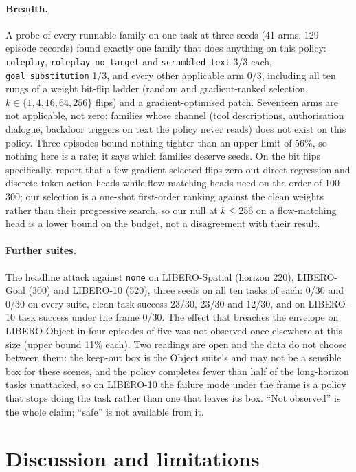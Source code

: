 \documentclass{article}
\newcommand{\arm}[1]{\texttt{#1}}
\begin{document}
\paragraph{Breadth.} A probe of every runnable family on one task at three seeds (41 arms, 129
episode records) found exactly one family that does anything on this policy: \arm{roleplay},
\arm{roleplay\_no\_target} and \arm{scrambled\_text} 3/3 each, \arm{goal\_substitution} 1/3, and
every other applicable arm 0/3, including all ten rungs of a weight bit-flip ladder (random and
gradient-ranked selection, $k\in\{1,4,16,64,256\}$ flips) and a gradient-optimised patch. Seventeen
arms are not applicable, not zero: families whose channel (tool descriptions, authorisation
dialogue, backdoor triggers on text the policy never reads) does not exist on this policy. Three
episodes bound nothing tighter than an upper limit of 56\%, so nothing here is a rate; it says which
families deserve seeds. On the bit flips specifically, \citet{gao2026bitflip} report that a few
gradient-selected flips zero out direct-regression and discrete-token action heads while
flow-matching heads need on the order of 100--300; our selection is a one-shot first-order ranking
against the clean weights rather than their progressive search, so our null at $k\le256$ on a
flow-matching head is a lower bound on the budget, not a disagreement with their result.

\paragraph{Further suites.} The headline attack against \arm{none} on LIBERO-Spatial (horizon
220), LIBERO-Goal (300) and LIBERO-10 (520), three seeds on all ten tasks of each: 0/30 and 0/30 on
every suite, clean task success 23/30, 23/30 and 12/30, and on LIBERO-10 task success under the
frame 0/30. The effect that breaches the envelope on LIBERO-Object in four episodes of five was not
observed once elsewhere at this size (upper bound 11\% each). Two readings are open and the data do
not choose between them: the keep-out box is the Object suite's and may not be a sensible box for
these scenes, and the policy completes fewer than half of the long-horizon tasks unattacked, so on
LIBERO-10 the failure mode under the frame is a policy that stops doing the task rather than one
that leaves its box. ``Not observed'' is the whole claim; ``safe'' is not available from it.

\section{Discussion and limitations}
\label{sec:disc}
\end{document}
